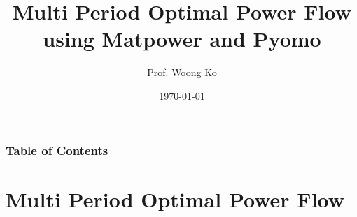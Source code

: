 \documentclass[
	11pt, %
	aspectratio=169, %
]{beamer}
\title[OPF using Matpower and Pyomo]{Multi Period Optimal Power Flow \\ using Matpower and Pyomo} %
\author[Woong Ko]{Prof. Woong Ko} %
\institute[CWNU]{Changwon National University \\ \smallskip \textit{kwoong@changwon.ac.kr}} %
\date[\today]{\today} %
\begin{document}

\begin{frame}
	\titlepage %
\end{frame}



\begin{frame}[allowframebreaks]
	\frametitle{Table of Contents} %
	
	\tableofcontents %
\end{frame}


\section{Multi Period Optimal Power Flow} %
\end{document}
